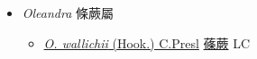 
  \begin{itemize}
 \item[] \textit{Oleandra} 條蕨屬
                    
  \begin{itemize}
        \item[] \href{http://www.theplantlist.org/tpl1.1/search?q=Oleandra+wallichii}{\textit{O. wallichii} (Hook.) C.Presl}   \href{\detokenize{http://taibnet.sinica.edu.tw/chi/taibnet_species_list.php?T2=蓧蕨&T2_new_value=true&fr=y}}{蓧蕨} LC
  \end{itemize}
  \end{itemize}
